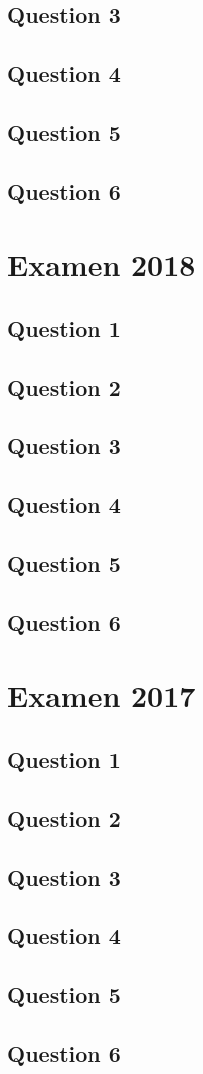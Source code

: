 \subsection*{Question 3}
\subsection*{Question 4}
\subsection*{Question 5}
\subsection*{Question 6}

\newpage
\section{Examen 2018}
\subsection*{Question 1}
\subsection*{Question 2}
\subsection*{Question 3}
\subsection*{Question 4}
\subsection*{Question 5}
\subsection*{Question 6}

\newpage
\section{Examen 2017}
\subsection*{Question 1}
\subsection*{Question 2}
\subsection*{Question 3}
\subsection*{Question 4}
\subsection*{Question 5}
\subsection*{Question 6}